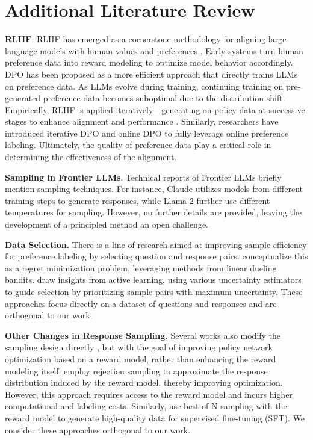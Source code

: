 \section{Additional Literature Review}\label{app:related_work}

\textbf{RLHF}. RLHF has emerged as a cornerstone methodology for aligning large language models with human values and preferences \citep{achiam2023gpt}. Early systems \citep{ouyang2022training} turn human preference data into reward modeling to optimize model behavior accordingly. DPO has been proposed as a more efficient approach that directly trains LLMs on preference data.  
As LLMs evolve during training, continuing training on pre-generated preference data becomes suboptimal due to the distribution shift. Empirically, RLHF is applied iteratively—generating on-policy data at successive stages to enhance alignment and performance \citep{touvron2023llama, bai2022training}. Similarly, researchers have introduced iterative DPO \citep{xiong2024iterative, xu2023some} and online DPO \citep{guo2024direct} to fully leverage online preference labeling. Ultimately, the quality of preference data play a critical role in determining the effectiveness of the alignment. 

\textbf{Sampling in Frontier LLMs}. Technical reports of Frontier LLMs briefly mention sampling techniques. For instance, Claude \citep{bai2022training} utilizes models from different training steps to generate responses, while Llama-2 \citep{touvron2023llama} further use different temperatures for sampling. However, no further details are provided, leaving the development of a principled method an open challenge. %

\textbf{Data Selection.} There is a line of research aimed at improving sample efficiency for preference labeling by selecting question and response pairs. \citet{scheid2024optimal} conceptualize this as a regret minimization problem, leveraging methods from linear dueling bandits. \citet{das2024active, mehta2023sample, muldrewactive, ji2024reinforcement} draw insights from active learning, using various uncertainty estimators to guide selection by prioritizing sample pairs with maximum uncertainty. These approaches focus directly on a dataset of questions and responses and are orthogonal to our work. 

\textbf{Other Changes in Response Sampling.} Several works also modify the sampling design directly \citep{liustatistical, dongraft}, but with the goal of improving policy network optimization based on a reward model, rather than enhancing the reward modeling itself. \citet{liustatistical} employ rejection sampling to approximate the response distribution induced by the reward model, thereby improving optimization. However, this approach requires access to the reward model and incurs higher computational and labeling costs. Similarly, \citet{dongraft} use best-of-N sampling with the reward model to generate high-quality data for supervised fine-tuning (SFT). We consider these approaches orthogonal to our work.


